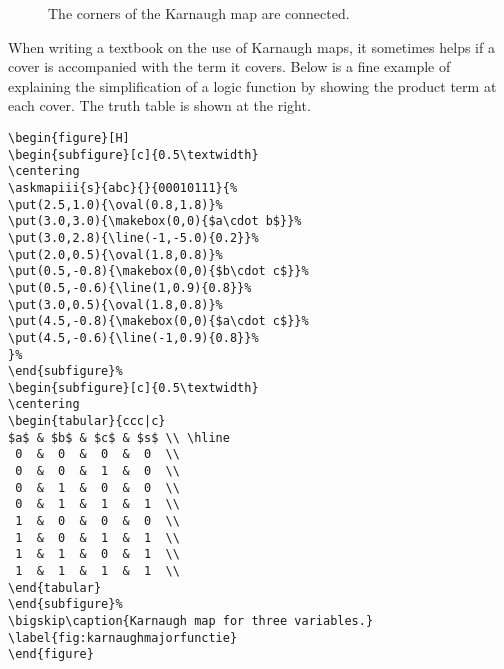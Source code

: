 \documentclass[a4paper,10pt]{ltxdoc}
\begin{document}
\begin{figure}[H]
\centering
{}%
\caption{The corners of the Karnaugh map are connected.}
\label{fig:kmapforfourvarcorner}
\end{figure}


When writing a textbook on the use of Karnaugh maps, it sometimes helps if
a cover is accompanied with the term it covers.
Below is a fine example of explaining the simplification of a logic function
by showing the product term at each cover. The truth table is shown at the
right.

\begin{verbatim}
\begin{figure}[H]
\begin{subfigure}[c]{0.5\textwidth}
\centering
\askmapiii{s}{abc}{}{00010111}{%
\put(2.5,1.0){\oval(0.8,1.8)}%
\put(3.0,3.0){\makebox(0,0){$a\cdot b$}}%
\put(3.0,2.8){\line(-1,-5.0){0.2}}%
\put(2.0,0.5){\oval(1.8,0.8)}%
\put(0.5,-0.8){\makebox(0,0){$b\cdot c$}}%
\put(0.5,-0.6){\line(1,0.9){0.8}}%
\put(3.0,0.5){\oval(1.8,0.8)}%
\put(4.5,-0.8){\makebox(0,0){$a\cdot c$}}%
\put(4.5,-0.6){\line(-1,0.9){0.8}}%
}%
\end{subfigure}%
\begin{subfigure}[c]{0.5\textwidth}
\centering
\begin{tabular}{ccc|c}
$a$ & $b$ & $c$ & $s$ \\ \hline
 0  &  0  &  0  &  0  \\
 0  &  0  &  1  &  0  \\
 0  &  1  &  0  &  0  \\
 0  &  1  &  1  &  1  \\
 1  &  0  &  0  &  0  \\
 1  &  0  &  1  &  1  \\
 1  &  1  &  0  &  1  \\
 1  &  1  &  1  &  1  \\
\end{tabular}
\end{subfigure}%
\bigskip\caption{Karnaugh map for three variables.}
\label{fig:karnaughmajorfunctie}
\end{figure}
\end{verbatim}
\end{document}
